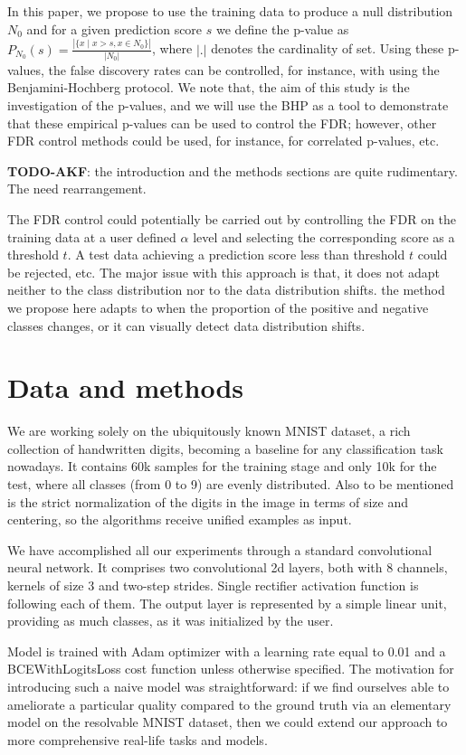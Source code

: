 \documentclass{article}
\newcommand{\todo}[2]{{\color{red} {\bf TODO-#1}: #2}}
\begin{document}
In this paper, we propose to use the training data to produce a null distribution $N_0$ and for a given prediction score $s$ we define the p-value as $P_{N_0}(s)=\frac{|\{x\mid x>s, x \in N_0\}|}{|N_0|}$, where $|.|$ denotes the cardinality of set. Using these p-values, the false discovery rates can be controlled, for instance, with using the Benjamini-Hochberg protocol. We note that, the aim of this study is the investigation of the p-values, and we will use the BHP as a tool to demonstrate that these empirical p-values can be used to control the FDR; however, other FDR control methods could be used, for instance, for correlated p-values, etc. 

\todo{AKF}{the introduction and the methods sections are quite rudimentary. The need rearrangement.}

The FDR control could potentially be carried out by controlling the FDR on the training data at a user defined $\alpha$ level and selecting the corresponding score as a threshold $t$. A test data achieving a prediction score less than threshold $t$ could be rejected, etc. The major issue with this approach is that, it does not adapt neither to the class distribution nor to the data distribution shifts. the method we propose here adapts to when the proportion of the positive and negative classes changes, or it can visually detect data distribution shifts. 


\section{Data and methods}

We are working solely on the ubiquitously known MNIST dataset, a rich collection of handwritten digits, becoming a baseline for any classification task nowadays. It contains 60k samples for the training stage and only 10k for the test, where all classes (from 0 to 9) are evenly distributed. Also to be mentioned is the strict normalization of the digits in the image in terms of size and centering, so the algorithms receive unified examples as input.

We have accomplished all our experiments through a standard convolutional neural network. It comprises two convolutional 2d layers, both with 8 channels, kernels of size 3 and two-step strides. Single rectifier activation function is following each of them.  The output layer is represented by a simple linear unit, providing as much classes, as it was initialized by the user.   

Model is trained with Adam optimizer with a learning rate equal to 0.01 and a BCEWithLogitsLoss cost function unless otherwise specified. The motivation for introducing such a naive model was straightforward: if we find ourselves able to ameliorate a particular quality compared to the ground truth via an elementary model on the resolvable MNIST dataset, then we could extend our approach to more comprehensive real-life tasks and models.
\end{document}
